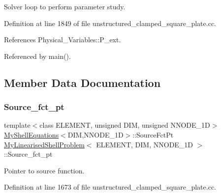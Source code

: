 Solver loop to perform parameter study. 



Definition at line 1849 of file unstructured\+\_\+clamped\+\_\+square\+\_\+plate.\+cc.



References Physical\+\_\+\+Variables\+::\+P\+\_\+ext.



Referenced by main().



\subsection{Member Data Documentation}
\mbox{\label{classMyLinearisedShellProblem_a55fd5e4ce59d478cb41bd8457e868dea}} 
\subsubsection{\texorpdfstring{Source\+\_\+fct\+\_\+pt}{Source\_fct\_pt}}
{\footnotesize\ttfamily template$<$class E\+L\+E\+M\+E\+NT, unsigned D\+IM, unsigned N\+N\+O\+D\+E\+\_\+1D$>$ \\
\hyperlink{classoomph_1_1MyShellEquations}{My\+Shell\+Equations}$<$D\+IM,N\+N\+O\+D\+E\+\_\+1D$>$\+::Source\+Fct\+Pt \hyperlink{classMyLinearisedShellProblem}{My\+Linearised\+Shell\+Problem}$<$ E\+L\+E\+M\+E\+NT, D\+IM, N\+N\+O\+D\+E\+\_\+1D $>$\+::Source\+\_\+fct\+\_\+pt\hspace{0.3cm}{\ttfamily [private]}}



Pointer to source function. 



Definition at line 1673 of file unstructured\+\_\+clamped\+\_\+square\+\_\+plate.\+cc.

\mbox{\label{classMyLinearisedShellProblem_a18e84aab4a7fad179e35d381e61c4584}} 
